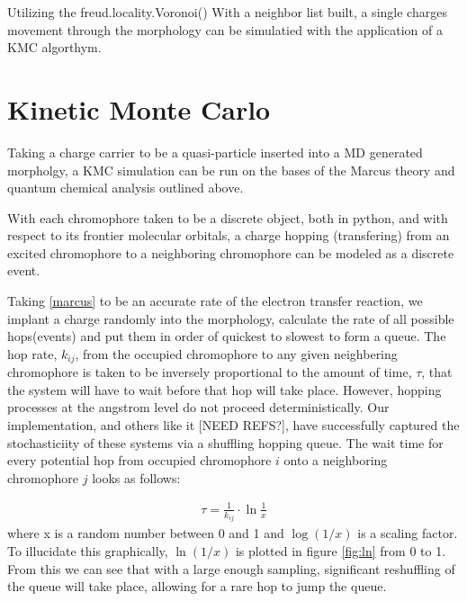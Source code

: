 Utilizing the freud.locality.Voronoi() 
With a neighbor list built, a single charges movement through the morphology can be simulatied with the
application of a KMC algorthym.

\section{Kinetic Monte Carlo}
\label{KMC}
Taking a charge carrier to be a quasi-particle inserted into a MD generated morpholgy, a KMC
simulation can be run on the bases of the Marcus theory and quantum chemical analysis outlined above. 

With each chromophore taken to be a discrete object, both in python, and with respect to its frontier
molecular orbitals, a charge hopping (transfering) from an excited chromophore to a neighboring chromophore can be modeled
as a discrete event.

Taking \autoref{marcus} to be an
accurate rate of the electron transfer reaction, we implant a charge randomly into the morphology, calculate
the rate of all possible hops(events)
and put them in order of quickest to slowest to form a queue. The hop rate, $k_{ij}$, from the occupied chromophore to any
given neighbering chromophore is taken to be
inversely proportional to the amount of time, $\tau$, that the system will have to wait before that hop will
take place. However, hopping processes at the angstrom level do not proceed deterministically. 
Our implementation, and others like it [NEED REFS?], have
successfully captured the stochasticiity of these systems via a shuffling hopping queue.
The wait time for every potential hop from occupied chromophore $i$ onto a
neighboring chromophore $j$ looks as follows:

\begin{align}
    \tau = \frac{1}{k_{ij}} \cdot \ln{\frac{1}{x}} 
\end{align}
where x is a random number between 0 and 1 and $\log{(1/x)}$ is a scaling factor. To illucidate this
graphically, $\ln{(1/x)}$ is plotted in figure \ref{fig:ln} from 0 to 1. From this we can see that with
a large enough sampling, significant reshuffling of the queue will take place, allowing for a rare hop to jump
the queue.

